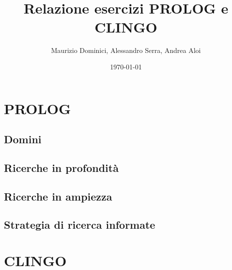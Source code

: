 \documentclass[a4paper,12pt, twoside]{report}
\title{Relazione esercizi PROLOG e CLINGO}
\author{Maurizio Dominici, Alessandro Serra, Andrea Aloi}
\date{\today}
\begin{document}
\maketitle
 
\tableofcontents
\newpage

\part{PROLOG}
\chapter{Domini}


\chapter{Ricerche in profondità}


\chapter{Ricerche in ampiezza}


\chapter{Strategia di ricerca informate} \label{cap:ric-inf}


\part{CLINGO}

\end{document}
